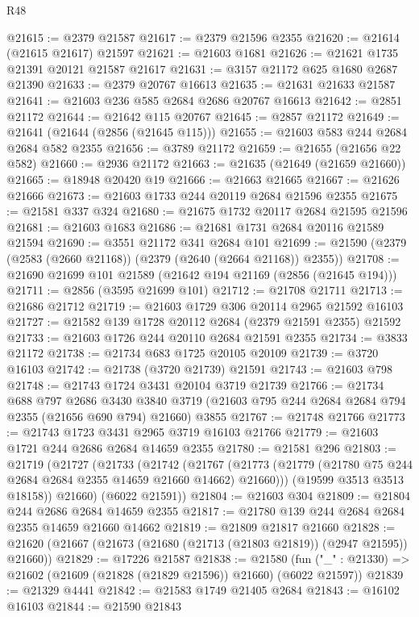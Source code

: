 \begin{lexlean}{R48}
\begin{coremodule}
@21615 := @2379 @21587
@21617 := @2379 @21596 @2355
@21620 := @21614 (@21615 @21617) @21597
@21621 := @21603 @1681
@21626 := @21621 @1735 @21391 @20121 @21587 @21617
@21631 := @3157 @21172 @625 @1680 @2687 @21390
@21633 := @2379 @20767 @16613
@21635 := @21631 @21633 @21587
@21641 := @21603 @236 @585 @2684 @2686 @20767 @16613
@21642 := @2851 @21172
@21644 := @21642 @115 @20767
@21645 := @2857 @21172
@21649 := @21641 (@21644 (@2856 (@21645 @115)))
@21655 := @21603 @583 @244 @2684 @2684 @582 @2355
@21656 := @3789 @21172
@21659 := @21655 (@21656 @22 @582)
@21660 := @2936 @21172
@21663 := @21635 (@21649 (@21659 @21660))
@21665 := @18948 @20420 @19
@21666 := @21663 @21665
@21667 := @21626 @21666
@21673 := @21603 @1733 @244 @20119 @2684 @21596 @2355
@21675 := @21581 @337 @324
@21680 := @21675 @1732 @20117 @2684 @21595 @21596
@21681 := @21603 @1683
@21686 := @21681 @1731 @2684 @20116 @21589 @21594
@21690 := @3551 @21172 @341 @2684 @101
@21699 := @21590 (@2379 (@2583 (@2660 @21168)) (@2379 (@2640 (@2664 @21168)) @2355))
@21708 := @21690 @21699 @101 @21589 (@21642 @194 @21169 (@2856 (@21645 @194)))
@21711 := @2856 (@3595 @21699 @101)
@21712 := @21708 @21711
@21713 := @21686 @21712
@21719 := @21603 @1729 @306 @20114 @2965 @21592 @16103
@21727 := @21582 @139 @1728 @20112 @2684 (@2379 @21591 @2355) @21592
@21733 := @21603 @1726 @244 @20110 @2684 @21591 @2355
@21734 := @3833 @21172
@21738 := @21734 @683 @1725 @20105 @20109
@21739 := @3720 @16103
@21742 := @21738 (@3720 @21739) @21591
@21743 := @21603 @798
@21748 := @21743 @1724 @3431 @20104 @3719 @21739
@21766 := @21734
    @688
    @797
    @2686
    @3430
    @3840
    @3719
    (@21603 @795 @244 @2684 @2684 @794 @2355 (@21656 @690 @794) @21660)
    @3855
@21767 := @21748 @21766
@21773 := @21743 @1723 @3431 @2965 @3719 @16103 @21766
@21779 := @21603 @1721 @244 @2686 @2684 @14659 @2355
@21780 := @21581 @296
@21803 := @21719
    (@21727
      (@21733
        (@21742
          (@21767 (@21773 (@21779 (@21780 @75 @244 @2684 @2684 @2355 @14659 @21660 @14662) @21660)))
          (@19599 @3513 @3513 @18158))
        @21660)
      (@6022 @21591))
@21804 := @21603 @304
@21809 := @21804 @244 @2686 @2684 @14659 @2355
@21817 := @21780 @139 @244 @2684 @2684 @2355 @14659 @21660 @14662
@21819 := @21809 @21817 @21660
@21828 := @21620 (@21667 (@21673 (@21680 (@21713 (@21803 @21819)) (@2947 @21595)) @21660))
@21829 := @17226 @21587
@21838 := @21580
    (fun ("_" : @21330) => @21602 (@21609 (@21828 (@21829 @21596)) @21660) (@6022 @21597))
@21839 := @21329 @4441
@21842 := @21583 @1749 @21405 @2684
@21843 := @16102 @16103
@21844 := @21590 @21843

\end{coremodule}
\end{lexlean}
